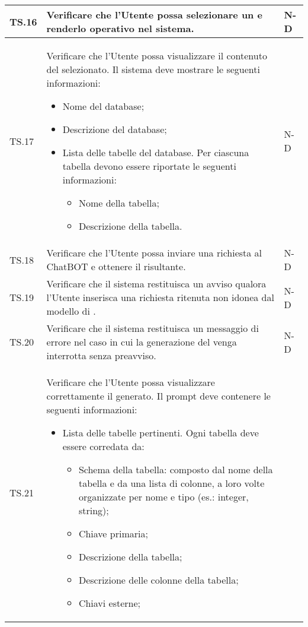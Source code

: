 \begin{adjustwidth}{-0.5cm}{-0.5cm}
\begin{longtable}{|P{1.5cm}|>{\raggedright}P{9.5cm}|>{\arraybackslash}P{1.5cm}|}
		\hline TS.16 & Verificare che l'Utente possa selezionare un  e renderlo operativo nel sistema. & N-D \\ 
		\hline TS.17 & Verificare che l'Utente possa visualizzare il contenuto del  selezionato. Il sistema deve mostrare le seguenti informazioni:
		\begin{itemize}
			\item Nome del database;
			\item Descrizione del database;
			\item Lista delle tabelle del database. Per ciascuna tabella devono essere riportate le seguenti informazioni:
				\begin{itemize}
					\item Nome della tabella;
					\item Descrizione della tabella.
				\end{itemize}
		\end{itemize} & N-D \\  
		\hline TS.18 & Verificare che l'Utente possa inviare una richiesta al ChatBOT e ottenere il  risultante. & N-D \\ 
		\hline TS.19 & Verificare che il sistema restituisca un avviso qualora l'Utente inserisca una richiesta ritenuta non idonea dal modello di . & N-D \\
		\hline TS.20 & Verificare che il sistema restituisca un messaggio di errore nel caso in cui la generazione del  venga interrotta senza preavviso. & N-D \\ 
		\hline TS.21 & Verificare che l'Utente possa visualizzare correttamente il  generato. Il prompt deve contenere le seguenti informazioni:
		\begin{itemize}
			\item Lista delle tabelle pertinenti. Ogni tabella deve essere corredata da:
			\begin{itemize}
				\item Schema della tabella: composto dal nome della tabella e da una lista di colonne, a loro volte organizzate per nome e tipo (es.: integer, string);
				\item Chiave primaria;
				\item Descrizione della tabella;
				\item Descrizione delle colonne della tabella;
				\item Chiavi esterne;
			\end{itemize}

\end{itemize}
\end{longtable}
\end{adjustwidth}
